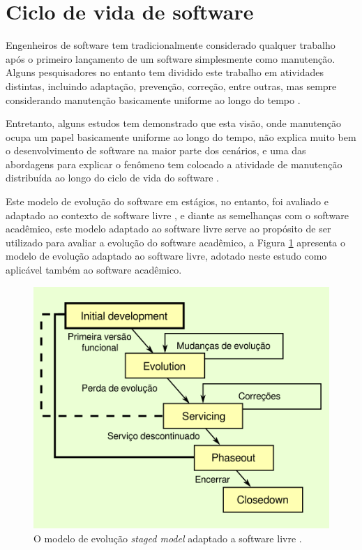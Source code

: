 \section{Ciclo de vida de software}
\label{sec:ciclo}


Engenheiros de software tem tradicionalmente considerado qualquer trabalho após
o primeiro lançamento de um software simplesmente como manutenção. Alguns
pesquisadores no entanto tem dividido este trabalho em atividades distintas, incluindo
adaptação, prevenção, correção, entre outras, mas sempre considerando manutenção
basicamente uniforme ao longo do tempo \cite{rajlich2000staged}.

Entretanto, alguns estudos tem demonstrado que esta visão, onde manutenção
ocupa um papel basicamente uniforme ao longo do tempo, não explica muito bem o
desenvolvimento de software na maior parte dos cenários, e uma das abordagens
para explicar o fenômeno tem colocado a atividade de manutenção distribuída ao
longo do ciclo de vida do software \cite{rajlich2000staged}.

Este modelo de evolução do software em estágios, no entanto, foi avaliado e adaptado
ao contexto de software livre \cite{capiluppi2007adapting}, e diante as
semelhanças com o software acadêmico, este modelo adaptado ao software livre serve ao propósito de ser
utilizado para
avaliar a evolução do software acadêmico, a Figura \ref{staged-model-foss-cycle}
apresenta o modelo de evolução adaptado ao software livre, adotado
neste estudo como aplicável também ao software acadêmico.

\begin{figure}[h]
  \center
  \includegraphics[scale=0.6]{imagens/staged-model-foss-cycle.png}
  \caption{O modelo de evolução {\it staged model} adaptado a software livre \cite{capiluppi2007adapting}.}
  \label{staged-model-foss-cycle}
\end{figure}

